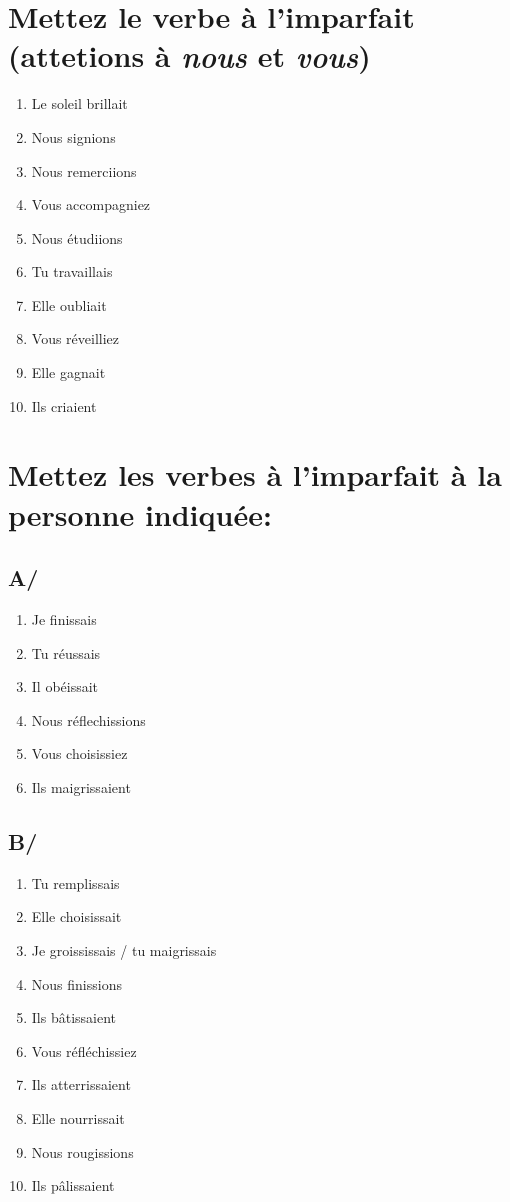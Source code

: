 \section{Mettez le verbe à l'imparfait (attetions à \emph{nous} et \emph{vous})}

\begin{enumerate}
    \item Le soleil brillait
    \item Nous signions
    \item Nous remerciions
    \item Vous accompagniez
    \item Nous étudiions
    \item Tu travaillais
    \item Elle oubliait
    \item Vous réveilliez
    \item Elle gagnait
    \item Ils criaient
\end{enumerate}

\section{Mettez les verbes à l'imparfait à la personne indiquée:}

\subsection{A/}

\begin{enumerate}
    \item Je finissais
    \item Tu réussais
    \item Il obéissait
    \item Nous réflechissions
    \item Vous choisissiez
    \item Ils maigrissaient
\end{enumerate}

\subsection{B/}

\begin{enumerate}
    \item Tu remplissais
    \item Elle choisissait
    \item Je groississais / tu maigrissais
    \item Nous finissions
    \item Ils bâtissaient
    \item Vous réfléchissiez
    \item Ils atterrissaient
    \item Elle nourrissait
    \item Nous rougissions
    \item Ils pâlissaient
\end{enumerate}

